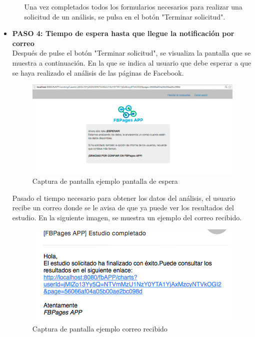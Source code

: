 \begin{itemize}
\begin{enumerate}
\begin{figure}[H]
\end{figure}
Una vez completados todos los formularios necesarios para realizar una solicitud de un análisis, se pulsa en el botón "Terminar solicitud".
\end{enumerate}
\item \textbf{PASO 4: Tiempo de espera hasta que llegue la notificación por correo}\\
Después de pulse el botón "Terminar solicitud", se visualiza la pantalla que se muestra a continuación. En la que se indica al usuario que debe esperar a que se haya realizado el análisis de las páginas de Facebook.
\begin{figure}[H]
\centering
\includegraphics[width=5in]{figuras/ejemploWorking.png}
\caption{Captura de pantalla ejemplo pantalla de espera} \label{fig:exWorking}
\end{figure}

Pasado el tiempo necesario para obtener los datos del análisis, el usuario recibe un correo donde se le avisa de que ya puede ver los resultados del estudio. En la siguiente imagen, se muestra un ejemplo del correo recibido.

\begin{figure}[H]
\centering
\includegraphics[width=5in]{figuras/ejemploCorreo.png}
\caption{Captura de pantalla ejemplo correo recibido} \label{fig:exCorreo}
\end{figure}


\end{itemize}
